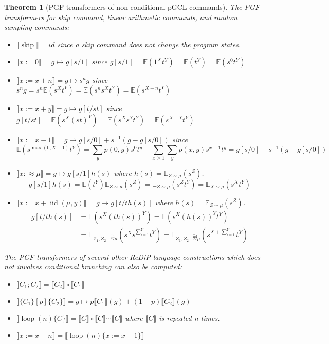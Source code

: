 \documentclass[a4paper]{article}
\DeclareMathOperator*{\iid}{iid}
\renewcommand{\S}[1]{ \llbracket #1 \rrbracket }
\newcommand{\E}{ \mathbb{E} }
\newtheorem{theorem}{Theorem}[section]
\begin{document}
\begin{theorem}[PGF transformers of non-conditional pGCL commands]
	The PGF transformers for skip command, linear arithmetic commands, and random sampling commands:
	\begin{itemize}
		\item \(\S{\operatorname{skip}} = id\) since a skip command does not change the program states.
		\item \(\S{x := 0} = g\mapsto g[s/1]\) since \( g[s/1] = \E(1^X t^Y) = \E(t^Y) = \E(s^0 t^Y) \)
		\item \(\S{x := x+n} = g\mapsto s^n g\) since \( s^n g = s^n \E(s^X t^Y) = \E(s^n s^X t^Y) = \E(s^{X+n} t^Y) \)
		\item \(\S{x := x+y} = g\mapsto g[t/st]\) since \( g[t/st] = \E(s^X {(st)}^Y) = \E(s^X s^Y t^Y) = \E(s^{X+Y} t^Y) \)
		\item \(\S{x := x-1} = g\mapsto g[s/0] + s^{-1}(g-g[s/0])\) since
		      \[
			      \mathbb{E}(s^{\max(0,X-1)} t^Y) =
			      \sum_y p(0,y) s^0 t^y + \sum_{x\geq 1} \sum_y p(x,y) s^{x-1} t^y
			      = g[s/0] + s^{-1}(g-g[s/0])
		      \]
		\item \(\S{x :\approx \mu} = g\mapsto g[s/1] h(s)\) where \(h(s) = \E_{Z\sim \mu}(s^Z)\).
		      \[
			      g[s/1] h(s)
			      = \E(t^Y) \E_{Z\sim \mu}(s^Z)
			      = \E_{Z\sim \mu}(s^Z t^Y)
			      = \E_{X\sim \mu}(s^X t^Y)
		      \]
		\item \(\S{x := x+\iid(\mu,y)} = g\mapsto g[t/t h(s)]\) where \(h(s) = \E_{Z\sim \mu}(s^Z)\).
		      \begin{align*}
			      g[t/t h(s)] & = \E(s^X {(t h(s))}^Y) = \E(s^X {(h(s))}^Y t^Y)                        \\
			                  & = \E_{Z_1,Z_2\ldots\stackrel{\iid}{\sim}\mu}(s^X s^{\sum_{i=1}^Y} t^Y)
			      = \E_{Z_1,Z_2\ldots\stackrel{\iid}{\sim}\mu}(s^{X+\sum_{i=1}^Y} t^Y)
		      \end{align*}
	\end{itemize}
	The PGF transformers of several other ReDiP language constructions which does not involves conditional branching can also be computed:
	\begin{itemize}
		\item \(\S{C_1;C_2} = \S{C_2}\circ \S{C_1}\)
		\item \(\S{\{C_1\}[p]\{C_2\}} = g\mapsto p \S{C_1}(g) + (1-p)\S{C_2}(g)\)
		\item \(\S{\operatorname{loop}(n)\{C\}} = \S{C}\circ \S{C} \cdots \S{C}\) where \(\S{C}\) is repeated n times.
		\item \(\S{x := x-n} = \S{\operatorname{loop}(n)\{x := x-1\}}\)
	\end{itemize}
\end{theorem}
\end{document}
